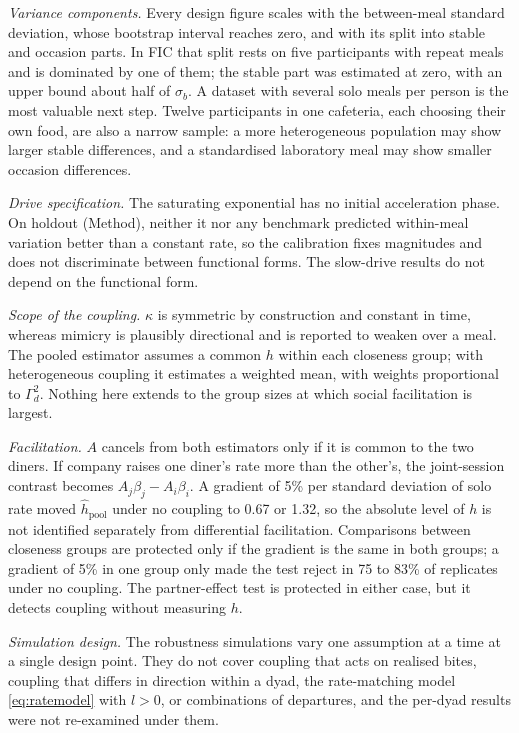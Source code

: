 \documentclass[12pt]{article}
\begin{document}
\emph{Variance components.} Every design figure scales with the between-meal
standard deviation, whose bootstrap interval reaches zero, and with its split
into stable and occasion parts. In FIC that split rests on five participants with
repeat meals and is dominated by one of them; the stable part was estimated at
zero, with an upper bound about half of $\sigma_b$. A dataset with several solo meals per person is the
most valuable next step. Twelve participants in one cafeteria, each choosing their
own food, are also a narrow sample: a more heterogeneous population may show larger
stable differences, and a standardised laboratory meal may show smaller occasion
differences.

\emph{Drive specification.} The saturating exponential has no initial
acceleration phase. On holdout (Method), neither it nor any benchmark predicted within-meal
variation better than a constant rate, so the calibration fixes magnitudes and
does not discriminate between functional forms. The slow-drive results do not
depend on the functional form.

\emph{Scope of the coupling.} $\kappa$ is symmetric by construction and constant in
time, whereas mimicry is plausibly directional and is reported to weaken over a
meal. The pooled estimator assumes a common $h$ within each closeness group; with
heterogeneous coupling it estimates a weighted mean, with weights proportional to
$\Gamma_d^2$. Nothing here extends to the group sizes at which social
facilitation is largest.

\emph{Facilitation.} $A$ cancels from both estimators only if it is common to the
two diners. If company raises one diner's rate more than the other's, the
joint-session contrast becomes $A_j\beta_j-A_i\beta_i$. A gradient of 5\% per
standard deviation of solo rate moved $\hat h_{\mathrm{pool}}$ under no coupling to
0.67 or 1.32, so the absolute level of $h$ is not identified separately from
differential facilitation. Comparisons between closeness groups are protected only
if the gradient is the same in both groups; a gradient of 5\% in one group only
made the test reject in 75 to 83\% of replicates under no coupling. The
partner-effect test is protected in either case, but it detects coupling without
measuring $h$.

\emph{Simulation design.} The robustness simulations vary one assumption at a time
at a single design point. They do not cover coupling that acts on realised bites,
coupling that differs in direction within a dyad, the rate-matching model
\eqref{eq:ratemodel} with $l>0$, or
combinations of departures, and the per-dyad results were not re-examined under
them.
\end{document}
